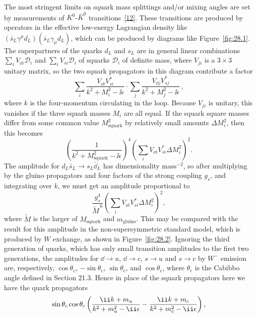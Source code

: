 The most stringent limits on squark mass splittings and/or mixing angles
are set by measurements of \(K^0\)-\(\bar K^0\)
transitions~\hyperref[ch28-ref-12]{[12]}. These transitions are produced
by operators in the effective low-energy Lagrangian density like
\((\bar{s}_L\gamma^\mu d_L)(\bar{s}_L\gamma_\mu d_L)\), which can be
produced by diagrams like Figure~\ref{fig:28.1}. The superpartners of the
quarks \(d_L\) and \(s_L\) are in general linear combinations
\(\sum_iV_{\dd i}\mathcal{D}_i\) and \(\sum_iV_{si}\mathcal{D}_i\) of
squarks \(\mathcal{D}_i\) of definite mass, where \(V_{ji}\) is a
\(3\times3\) unitary matrix, so the two squark propagators in
this diagram contribute a factor
\[
  \sum_i\frac{V_{\dd i}V_{si}^*}{k^2+M_i^2-\ii\epsilon}
  \mathbin{\cdot}
  \sum_j\frac{V_{\dd j}V_{sj}^*}{k^2+M_j^2-\ii\epsilon}\,,
\]
where \(k\) is the four-momentum circulating in the loop. Because
\(V_{ji}\) is unitary, this vanishes if the three squark masses \(M_i\)
are all equal. If the squark square masses differ from some common value
\(M_{\mathrm{squark}}^2\) by relatively small amounts \(\Delta M_i^2\),
then this becomes
\[
  \left(
    \frac{1}{k^2+M_{\mathrm{squark}}^2-\ii\epsilon}
  \right)^{\!4}
  \left(
    \sum_iV_{\dd i}V_{si}^*\Delta M_i^2
  \right)^{\!2}.
\]
The amplitude for
\(d_L\bar{s}_L\longrightarrow s_L\bar{\dd}_L\) has dimensionality
mass\(^{-2}\), so after multiplying by the gluino propagators and four
factors of the strong coupling \(g_s\), and integrating over \(k\), we
must get an amplitude proportional to
\begin{equation}
  \frac{g_s^4}{\widetilde{M}^{\,6}}
  \left(
    \sum_iV_{\dd i}V_{si}^*\Delta M_i^2
  \right)^{\!2},
  \tag{28.4.3}\label{eq:28.4.3}
\end{equation}
where \(\widetilde{M}\) is the larger of \(M_{\mathrm{squark}}\) and
\(m_{\mathrm{gluino}}\). This may be compared with the result for this
amplitude in the non-supersymmetric standard model, which is produced by
\(W\) exchange, as shown in Figure~\ref{fig:28.2}. Ignoring the third
generation of quarks, which has only small transition amplitudes to the
first two generations, the amplitudes for \(\dd\longrightarrow u\),
\(\dd\longrightarrow c\), \(s\longrightarrow u\) and
\(s\longrightarrow c\) by \(W^-\) emission are, respectively,
\(\cos\theta_c\), \(-\sin\theta_c\), \(\sin\theta_c\), and
\(\cos\theta_c\), where \(\theta_c\) is the Cabibbo angle defined in
Section 21.3. Hence in place of the squark propagators here we have the
quark propagators
\[
  \sin\theta_c\cos\theta_c
  \left(
    \frac{\ii\sl{k}+m_u}{k^2+m_u^2-\ii\epsilon}
    -
    \frac{\ii\sl{k}+m_c}{k^2+m_c^2-\ii\epsilon}
  \right),
\]
